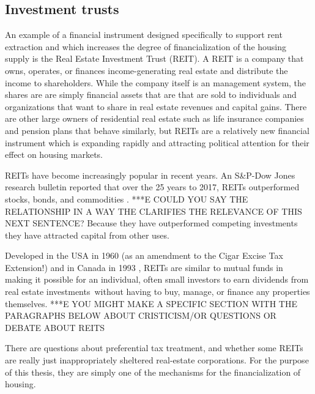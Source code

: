 \subsection{Investment trusts}
An example of a financial instrument designed specifically to support rent extraction and which  increases the degree of financialization of the housing supply is the  Real Estate Investment Trust (REIT).  A REIT is a company that owns, operates, or finances income-generating real estate and distribute the income to shareholders. While the company itself is an management system, the shares are are simply financial assets that are that are sold to individuals and organizations that want to share in real estate revenues and capital gains. There are other large owners of residential real estate such as life insurance companies and pension plans that behave similarly, but REITs are a relatively new financial instrument which is  expanding rapidly and attracting political attention for their effect on housing markets.  %

REITs have become increasingly popular in recent years.  An S\&P-Dow Jones research bulletin reported that over the  25 years to 2017, REITs outperformed stocks, bonds, and commodities \cite{GET-Dow-Jones-research-bulletin}. ***E COULD YOU SAY THE RELATIONSHIP IN A WAY THE CLARIFIES THE RELEVANCE OF THIS NEXT SENTENCE? %
Because they have outperformed competing investments they have attracted  capital from other uses.

Developed in the USA  in 1960 (as an amendment to the Cigar Excise Tax Extension!) and in Canada in 1993 \cite{GET_REITsDevelopedDates}, REITs are similar to mutual funds in making it possible for an individual, often small investors to earn dividends from real estate investments without having to buy, manage, or finance any properties themselves. 
***E YOU MIGHT MAKE A SPECIFIC SECTION WITH THE PARAGRAPHS BELOW ABOUT CRISTICISM/OR QUESTIONS OR DEBATE ABOUT REITS %

There are questions about preferential tax treatment, and whether some REITs are really just inappropriately sheltered real-estate corporations.  For the purpose of this thesis, they are simply one of the mechanisms for the financialization of housing.


